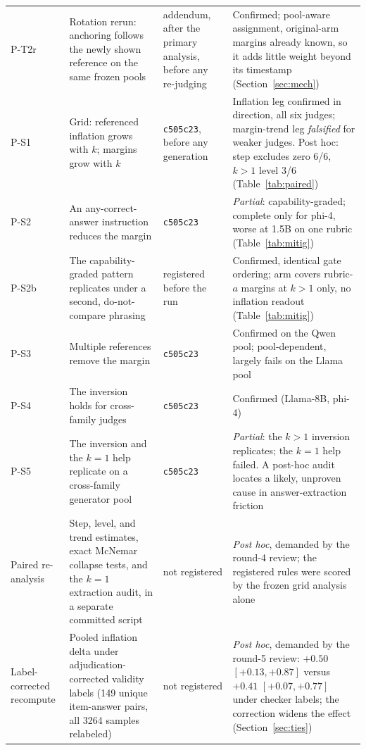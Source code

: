 \documentclass[11pt]{article}
\begin{document}
\begin{longtable}{L{1.7cm}L{5.3cm}L{2.5cm}L{5.1cm}}
\addlinespace[1pt]
P-T2r & Rotation rerun: anchoring follows the newly shown reference on the same frozen pools & addendum, after the primary analysis, before any re-judging & Confirmed; pool-aware assignment, original-arm margins already known, so it adds little weight beyond its timestamp (Section~\ref{sec:mech}) \\
\addlinespace[1pt]
P-S1 & Grid: referenced inflation grows with $k$; margins grow with $k$ & \texttt{c505c23}, before any generation & Inflation leg confirmed in direction, all six judges; margin-trend leg \emph{falsified} for weaker judges. Post hoc: step excludes zero 6/6, $k{>}1$ level 3/6 (Table~\ref{tab:paired}) \\
\addlinespace[1pt]
P-S2 & An any-correct-answer instruction reduces the margin & \texttt{c505c23} & \emph{Partial}: capability-graded; complete only for phi-4, worse at 1.5B on one rubric (Table~\ref{tab:mitig}) \\
\addlinespace[1pt]
P-S2b & The capability-graded pattern replicates under a second, do-not-compare phrasing & registered before the run & Confirmed, identical gate ordering; arm covers rubric-$a$ margins at $k{>}1$ only, no inflation readout (Table~\ref{tab:mitig}) \\
\addlinespace[1pt]
P-S3 & Multiple references remove the margin & \texttt{c505c23} & Confirmed on the Qwen pool; pool-dependent, largely fails on the Llama pool \\
\addlinespace[1pt]
P-S4 & The inversion holds for cross-family judges & \texttt{c505c23} & Confirmed (Llama-8B, phi-4) \\
\addlinespace[1pt]
P-S5 & The inversion and the $k{=}1$ help replicate on a cross-family generator pool & \texttt{c505c23} & \emph{Partial}: the $k{>}1$ inversion replicates; the $k{=}1$ help failed. A post-hoc audit locates a likely, unproven cause in answer-extraction friction \\
\addlinespace[1pt]
Paired re-analysis & Step, level, and trend estimates, exact McNemar collapse tests, and the $k{=}1$ extraction audit, in a separate committed script & not registered & \emph{Post hoc}, demanded by the round-4 review; the registered rules were scored by the frozen grid analysis alone \\
\addlinespace[1pt]
Label-corrected recompute & Pooled inflation delta under adjudication-corrected validity labels (149 unique item-answer pairs, all 3264 samples relabeled) & not registered & \emph{Post hoc}, demanded by the round-5 review: $+0.50$ $[+0.13, +0.87]$ versus $+0.41$ $[+0.07, +0.77]$ under checker labels; the correction widens the effect (Section~\ref{sec:ties}) \\

\end{longtable}
\end{document}
